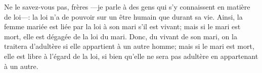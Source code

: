 Ne le savez-vous pas, frères
	---je parle à des gens qui s’y connaissent en matière de loi---:
	la loi n’a de pouvoir sur un être humain que durant sa vie.
Ainsi, la femme mariée est liée par la loi à son mari s’il est vivant;
	mais si le mari est mort, elle est dégagée de la loi du mari.
Donc, du vivant de son mari,
		on la traitera d’adultère si elle appartient à un autre homme;
	mais si le mari est mort, elle est libre à l’égard de la loi,
	si bien qu’elle ne sera pas adultère en appartenant à un autre.
